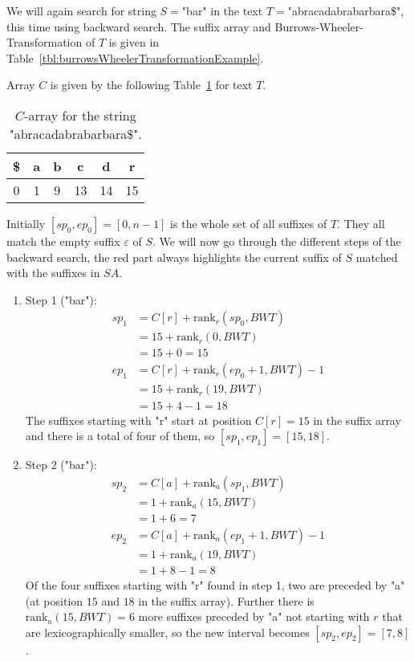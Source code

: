 \begin{Example}
  We will again search for string $S=$"bar" in the text $T=$"abracadabrabarbara\$", this time using backward search. The suffix array and Burrows-Wheeler-Transformation of $T$ is given in Table~\ref{tbl:burrowsWheelerTransformationExample}.

  Array $C$ is given by the following Table~\ref{tbl:backwardSearchCExample} for text $T$.
  \begin{table}[htb]
    \centering
    \begin{tabular}{cccccc}
      \toprule
      \$ & a & b & c & d & r \\
      \midrule
      0 & 1 & 9 & 13 & 14 & 15 \\
      \bottomrule
    \end{tabular}
    \caption{$C$-array for the string "abracadabrabarbara\$".}
    \label{tbl:backwardSearchCExample}
  \end{table}

  Initially $[sp_0,ep_0]=[0,n-1]$ is the whole set of all suffixes of $T$. They all match the empty suffix $\varepsilon$ of $S$. We will now go through the different steps of the backward search, the red part always highlights the current suffix of $S$ matched with the suffixes in $SA$.
  \begin{enumerate}
    \item Step 1 ("ba{\color{red}r}"):
    \begin{align*}
      sp_1 &= C[r] + \mathrm{rank}_r(sp_0, BWT) \\
           &= 15 + \mathrm{rank}_r(0, BWT) \\
           &= 15 + 0 = 15 \\
      ep_1 &= C[r] + \mathrm{rank}_r(ep_0 + 1, BWT) - 1 \\
           &= 15 + \mathrm{rank}_r(19, BWT) \\
           &= 15 + 4 - 1 = 18
    \end{align*}
    The suffixes starting with "r" start at position $C[r]=15$ in the suffix array and there is a total of four of them, so $[sp_1,ep_1]=[15,18]$.

    \item Step 2 ("b{\color{red}ar}"):
    \begin{align*}
      sp_2 &= C[a] + \mathrm{rank}_a(sp_1, BWT) \\
           &= 1 + \mathrm{rank}_a(15, BWT) \\
           &= 1 + 6 = 7 \\
      ep_2 &= C[a] + \mathrm{rank}_a(ep_1 + 1, BWT) - 1 \\
           &= 1 + \mathrm{rank}_a(19, BWT) \\
           &= 1 + 8 - 1 = 8
    \end{align*}
    Of the four suffixes starting with "r" found in step 1, two are preceded by "a" (at position $15$ and $18$ in the suffix array). Further there is $\mathrm{rank}_a(15, BWT)=6$ more suffixes preceded by "a" not starting with $r$ that are lexicographically smaller, so the new interval becomes $[sp_2,ep_2]=[7,8]$.


\end{enumerate}
\end{Example}
